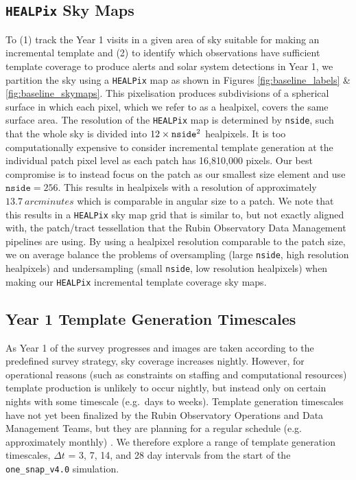 \documentclass[preprintm,linenumbers]{aastex631}
\newcommand{\baseline}{\texttt{one\_snap\_v4.0}\xspace}
\newcommand{\nside}{\texttt{nside}\xspace}
\newcommand{\healpix}{\texttt{HEALPix}\xspace} %
\begin{document}
	\subsection{\healpix Sky Maps} 
	\label{sec:ITG}
	To (1) track the Year 1 visits in a given area of sky suitable for making an incremental template and (2) to identify which observations have sufficient template coverage to produce alerts and solar system detections in Year 1, we partition the sky using a \healpix map \citep[Hierarchical Equal Area isoLatitude Pixelization\footnote{\url{http://healpix.sourceforge.net}}; ][]{2005ApJ...622..759G} as shown in Figures \ref{fig:baseline_labels} \& \ref{fig:baseline_skymaps}.
    This pixelisation produces subdivisions of a spherical surface in which each pixel, which we refer to as a healpixel, covers the same surface area. 
 The resolution of the \healpix map is determined by \nside, such that the whole sky is divided into $12\times \verb|nside|^2$ healpixels.
 It is too computationally expensive to consider incremental template generation at the individual patch pixel level as each patch has 16,810,000 pixels. 
 Our best compromise is to instead focus on the patch as our smallest size element and use $\texttt{nside}=256$. This results in healpixels with a resolution of approximately $13.7\ \si{arcminutes}$ which is comparable in angular size to a patch. %
	We note that this results in a \healpix sky map grid that is similar to, but not exactly aligned with, the patch/tract tessellation that the Rubin Observatory Data Management pipelines are using.  
 By using a healpixel resolution comparable to the patch size, we on average balance the problems of oversampling (large \nside, high resolution healpixels) and undersampling (small \nside, low resolution healpixels) when making our \healpix incremental template coverage sky maps.
	
	\subsection{Year 1 Template Generation Timescales}
	\label{sec:timescales}
	As Year 1 of the survey progresses and images are taken according to the predefined survey strategy, sky coverage increases nightly. 
 However, for operational reasons (such as constraints on staffing and computational resources)  template production is unlikely to occur nightly, but instead only on certain nights with some timescale (e.g.\ days to weeks). 
 Template generation timescales have not yet been finalized by the Rubin Observatory Operations and Data Management Teams, but they are planning for a regular schedule (e.g. approximately monthly) \citep{DMTN-107,RTN-011}. 
 We therefore explore a range of template generation timescales, $\Delta t$ =  3, 7, 14, and 28 day intervals from the start of the \baseline simulation. 
	
\end{document}
